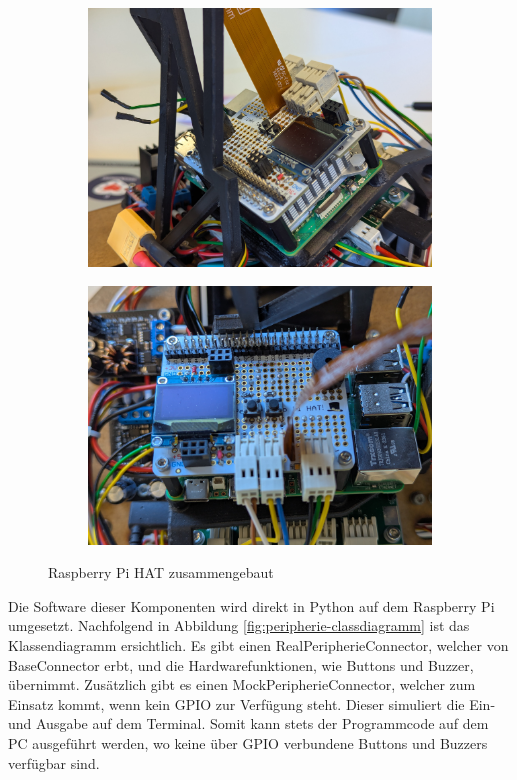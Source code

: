 \begin{figure}[H]
    \centering
    \begin{subfigure}[t]{0.49\textwidth}
        \includegraphics[width=\linewidth]{assets/IT/peripherie/raspi-hat_1.jpg}
    \end{subfigure}
    \hfill
    \begin{subfigure}[t]{0.49\textwidth}
        \includegraphics[width=\linewidth]{assets/IT/peripherie/raspi-hat_2.jpg}
    \end{subfigure}
    \caption{Raspberry Pi HAT zusammengebaut}
    \label{fig:raspiheader-assembly}
\end{figure}

Die Software dieser Komponenten wird direkt in Python auf dem Raspberry Pi umgesetzt. Nachfolgend in Abbildung \ref{fig:peripherie-classdiagramm} ist das Klassendiagramm ersichtlich. Es gibt einen RealPeripherieConnector, welcher von BaseConnector erbt, und die Hardwarefunktionen, wie Buttons und Buzzer, übernimmt. Zusätzlich gibt es einen MockPeripherieConnector, welcher zum Einsatz kommt, wenn kein GPIO zur Verfügung steht. Dieser simuliert die Ein- und Ausgabe auf dem Terminal. Somit kann stets der Programmcode auf dem PC ausgeführt werden, wo keine über GPIO verbundene Buttons und Buzzers verfügbar sind.


